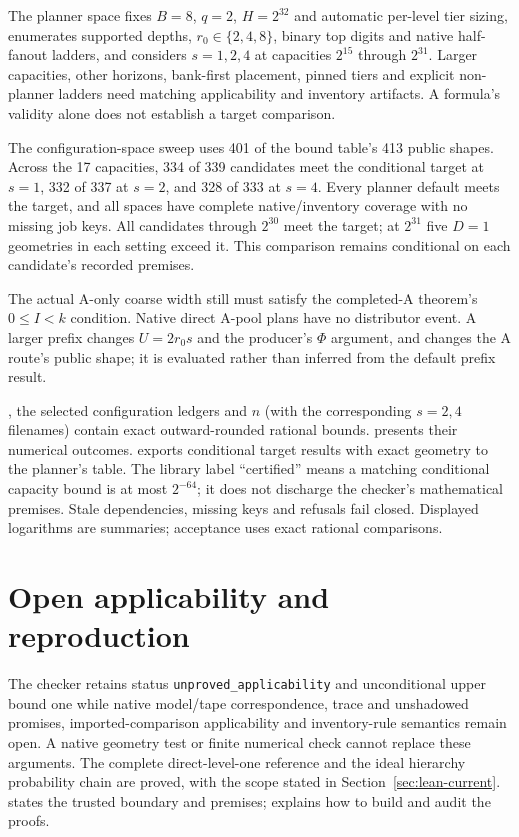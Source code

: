 \documentclass[11pt]{article}
\theoremstyle{definition}
\theoremstyle{remark}
\begin{document}
The planner space fixes $B=8$, $q=2$, $H=2^{32}$ and automatic per-level tier
sizing, enumerates supported depths, $r_0\in\{2,4,8\}$, binary top digits
and native half-fanout ladders, and considers $s=1,2,4$ at capacities
$2^{15}$ through $2^{31}$. Larger capacities, other horizons, bank-first
placement, pinned tiers and explicit non-planner ladders need matching
applicability and inventory artifacts. A formula's validity alone does not
establish a target comparison.

The configuration-space sweep uses 401 of the bound table's 413 public
shapes. Across the 17 capacities,
334 of 339 candidates meet the conditional target at $s=1$, 332 of 337 at
$s=2$, and 328 of 333 at $s=4$. Every planner default meets the target,
and all spaces have complete native/inventory coverage with no missing job
keys. All candidates through $2^{30}$ meet the target; at $2^{31}$ five
$D=1$ geometries in each setting exceed it. This comparison remains
conditional on each candidate's recorded premises.

The actual A-only coarse width still must satisfy the completed-A theorem's
$0\le I<k$ condition. Native direct A-pool plans have no distributor event.
A larger prefix changes $U=2r_0s$ and the producer's $\Phi$ argument, and
changes the A route's public shape; it is evaluated rather than inferred
from the default prefix result.

, the selected configuration ledgers and
$n$ (with the corresponding
$s=2,4$ filenames) contain exact outward-rounded rational bounds.
 presents their numerical outcomes.
 exports conditional target results
with exact geometry to the planner's table. The library label ``certified''
means a matching conditional capacity bound is at most $2^{-64}$; it does
not discharge the checker's mathematical premises. Stale dependencies,
missing keys and refusals fail closed. Displayed logarithms are summaries;
acceptance uses exact rational comparisons.

\section{Open applicability and reproduction}
\label{sec:evidence}\label{sec:remaining}
The checker retains status \texttt{unproved\_applicability} and unconditional
upper bound one while native model/tape correspondence, trace and unshadowed
promises, imported-comparison applicability and inventory-rule semantics
remain open. A native geometry test or finite numerical check cannot replace
these arguments. The complete direct-level-one reference and the ideal
hierarchy probability chain are proved, with the scope stated in
Section~\ref{sec:lean-current}.  states the trusted
boundary and premises;  explains how to build and audit
the proofs.
\end{document}
